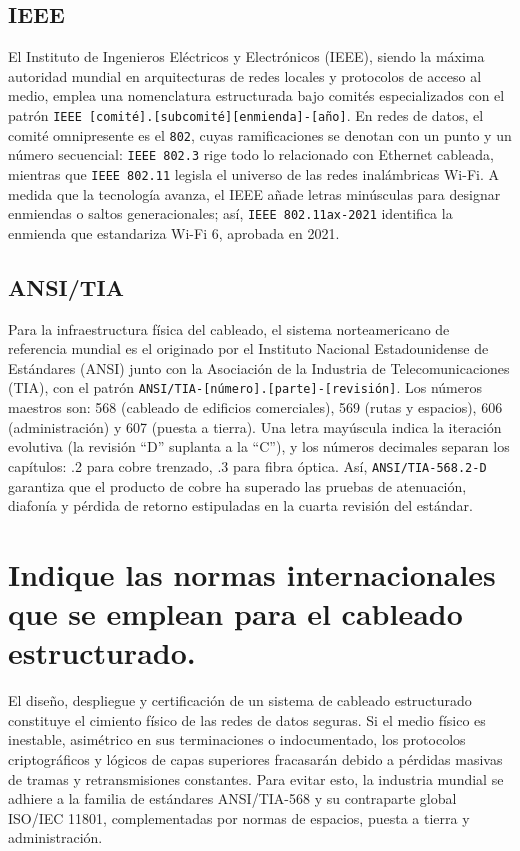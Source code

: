 \documentclass[a4paper,12pt]{article}
\begin{document}
\subsection*{IEEE}

El Instituto de Ingenieros Eléctricos y Electrónicos (IEEE), siendo la máxima autoridad mundial en arquitecturas de redes locales y protocolos de acceso al medio, emplea una nomenclatura estructurada bajo comités especializados con el patrón \texttt{IEEE [comité].[subcomité][enmienda]-[año]}. En redes de datos, el comité omnipresente es el \texttt{802}, cuyas ramificaciones se denotan con un punto y un número secuencial: \texttt{IEEE 802.3} rige todo lo relacionado con Ethernet cableada, mientras que \texttt{IEEE 802.11} legisla el universo de las redes inalámbricas Wi-Fi. A medida que la tecnología avanza, el IEEE añade letras minúsculas para designar enmiendas o saltos generacionales; así, \texttt{IEEE 802.11ax-2021} identifica la enmienda que estandariza Wi-Fi 6, aprobada en 2021.

\subsection*{ANSI/TIA}

Para la infraestructura física del cableado, el sistema norteamericano de referencia mundial es el originado por el Instituto Nacional Estadounidense de Estándares (ANSI) junto con la Asociación de la Industria de Telecomunicaciones (TIA), con el patrón \texttt{ANSI/TIA-[número].[parte]-[revisión]}. Los números maestros son: 568 (cableado de edificios comerciales), 569 (rutas y espacios), 606 (administración) y 607 (puesta a tierra). Una letra mayúscula indica la iteración evolutiva (la revisión ``D'' suplanta a la ``C''), y los números decimales separan los capítulos: .2 para cobre trenzado, .3 para fibra óptica. Así, \texttt{ANSI/TIA-568.2-D} garantiza que el producto de cobre ha superado las pruebas de atenuación, diafonía y pérdida de retorno estipuladas en la cuarta revisión del estándar.

\newpage

\section{Indique las normas internacionales que se emplean para el cableado estructurado.}

El diseño, despliegue y certificación de un sistema de cableado estructurado constituye el cimiento físico de las redes de datos seguras. Si el medio físico es inestable, asimétrico en sus terminaciones o indocumentado, los protocolos criptográficos y lógicos de capas superiores fracasarán debido a pérdidas masivas de tramas y retransmisiones constantes. Para evitar esto, la industria mundial se adhiere a la familia de estándares ANSI/TIA-568 y su contraparte global ISO/IEC 11801, complementadas por normas de espacios, puesta a tierra y administración.
\end{document}
